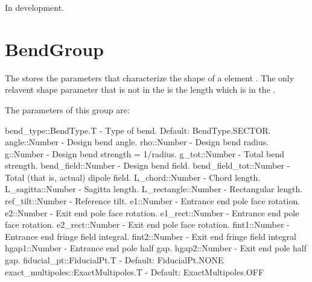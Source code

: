 In development.

\section{BendGroup}
\label{s:bend.g}

The  stores the parameters that characterize the shape of a  element
. The only relavent shape parameter that is not in the  is the
length  which is in the .

The parameters of this group are:
\begin{example}
  bend_type::BendType.T     - Type of bend. Default: BendType.SECTOR.
  angle::Number             - Design bend angle.
  rho::Number               - Design bend radius.
  g::Number                 - Design bend strength = 1/radius.
  g_tot::Number             - Total bend strength.
  bend_field::Number        - Design bend field.
  bend_field_tot::Number    - Total (that is, actual) dipole field.
  L_chord::Number           - Chord length.
  L_sagitta::Number         - Sagitta length.
  L_rectangle::Number       - Rectangular length.
  ref_tilt::Number          - Reference tilt.
  e1::Number                - Entrance end pole face rotation.
  e2::Number                - Exit end pole face rotation.
  e1_rect::Number           - Entrance end pole face rotation.
  e2_rect::Number           - Exit end pole face rotation.
  fint1::Number             - Entrance end fringe field integral.
  fint2::Number             - Exit end fringe field integral
  hgap1::Number             - Entrance end pole half gap.
  hgap2::Number             - Exit end pole half gap.
  fiducial_pt::FiducialPt.T            - Default: FiducialPt.NONE
  exact_multipoles::ExactMultipoles.T  - Default: ExactMultipoles.OFF
\end{example}

